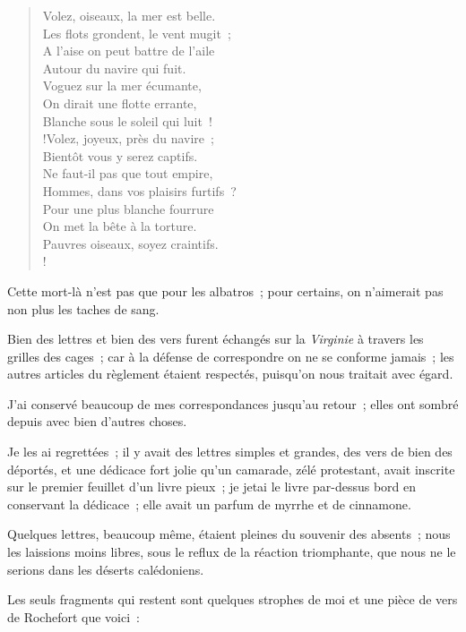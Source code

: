 \documentclass[french,twoside]{book} %
\begin{document}
\begin{verse}
Volez, oiseaux, la mer est belle.\\
Les flots grondent, le vent mugit ;\\
A l’aise on peut battre de l’aile\\
Autour du navire qui fuit.\\
Voguez sur la mer écumante,\\
On dirait une flotte errante,\\
Blanche sous le soleil qui luit !\\!Volez, joyeux, près du navire ;\\
Bientôt vous y serez captifs.\\
Ne faut-il pas que tout empire,\\
Hommes, dans vos plaisirs furtifs ?\\
Pour une plus blanche fourrure\\
On met la bête à la torture.\\
Pauvres oiseaux, soyez craintifs.\\!
\end{verse}

\noindent Cette mort-là n’est pas que pour les albatros ; pour certains, on n’aimerait pas non plus les taches de sang.\par
Bien des lettres et bien des vers furent échangés sur la \emph{Virginie} à travers les grilles des cages ; car à la défense de correspondre on ne se conforme jamais ; les autres articles du règlement  étaient respectés, puisqu’on nous traitait avec égard.\par
J’ai conservé beaucoup de mes correspondances jusqu’au retour ; elles ont sombré depuis avec bien d’autres choses.\par
Je les ai regrettées ; il y avait des lettres simples et grandes, des vers de bien des déportés, et une dédicace fort jolie qu’un camarade, zélé protestant, avait inscrite sur le premier feuillet d’un livre pieux ; je jetai le livre par-dessus bord en conservant la dédicace ; elle avait un parfum de myrrhe et de cinnamone.\par
Quelques lettres, beaucoup même, étaient pleines du souvenir des absents ; nous les laissions moins libres, sous le reflux de la réaction triomphante, que nous ne le serions dans les déserts calédoniens.\par
Les seuls fragments qui restent sont quelques strophes de moi et une pièce de vers de Rochefort que voici :\par
\end{document}
